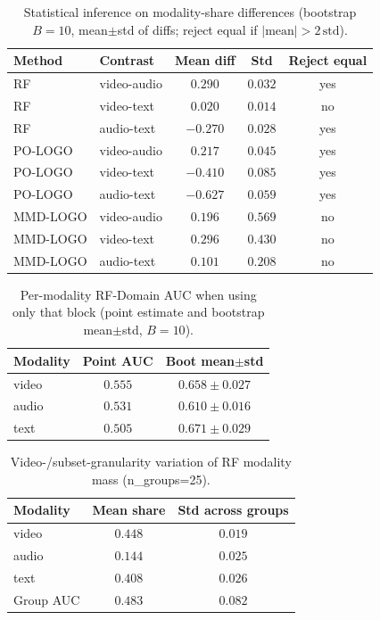 \begin{table}[ht]
\centering
\caption{Statistical inference on modality-share differences (bootstrap $B=10$, mean$\pm$std of diffs; reject equal if $|\mathrm{mean}| > 2\,\mathrm{std}$).}
\label{tab:msrvtt-si-diff}
\small
\begin{tabular}{@{}l l c c c@{}}
\toprule
Method & Contrast & Mean diff & Std & Reject equal \\
\midrule
RF & video-audio & $0.290$ & $0.032$ & yes \\
RF & video-text & $0.020$ & $0.014$ & no \\
RF & audio-text & $-0.270$ & $0.028$ & yes \\
PO-LOGO & video-audio & $0.217$ & $0.045$ & yes \\
PO-LOGO & video-text & $-0.410$ & $0.085$ & yes \\
PO-LOGO & audio-text & $-0.627$ & $0.059$ & yes \\
MMD-LOGO & video-audio & $0.196$ & $0.569$ & no \\
MMD-LOGO & video-text & $0.296$ & $0.430$ & no \\
MMD-LOGO & audio-text & $0.101$ & $0.208$ & no \\
\bottomrule
\end{tabular}
\end{table}

\begin{table}[ht]
\centering
\caption{Per-modality RF-Domain AUC when using only that block (point estimate and bootstrap mean$\pm$std, $B=10$).}
\label{tab:msrvtt-mod-auc}
\small
\begin{tabular}{@{}l c c@{}}
\toprule
Modality & Point AUC & Boot mean$\pm$std \\
\midrule
video & $0.555$ & $0.658\pm0.027$ \\
audio & $0.531$ & $0.610\pm0.016$ \\
text & $0.505$ & $0.671\pm0.029$ \\
\bottomrule
\end{tabular}
\end{table}

\begin{table}[ht]
\centering
\caption{Video-/subset-granularity variation of RF modality mass (n\_groups=25).}
\label{tab:msrvtt-granularity}
\small
\begin{tabular}{@{}l c c@{}}
\toprule
Modality & Mean share & Std across groups \\
\midrule
video & $0.448$ & $0.019$ \\
audio & $0.144$ & $0.025$ \\
text & $0.408$ & $0.026$ \\
\midrule
Group AUC & $0.483$ & $0.082$ \\
\bottomrule
\end{tabular}
\end{table}

